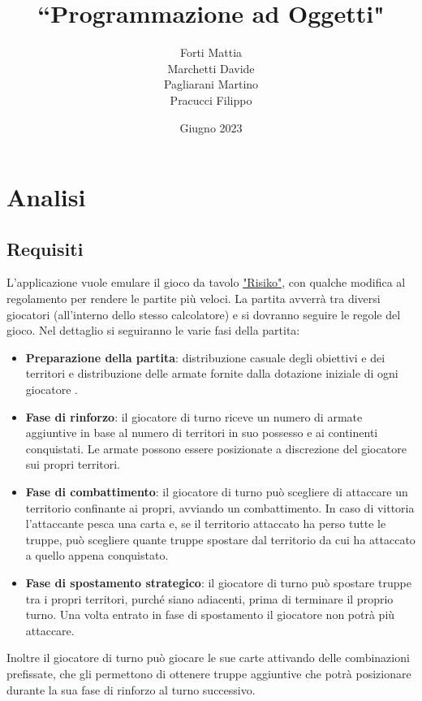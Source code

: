 \documentclass[a4paper,12pt]{report}
\title{\textbf{``Programmazione ad Oggetti"}}
\author{Forti Mattia \\Marchetti Davide  \\Pagliarani Martino \\Pracucci Filippo}
\date{Giugno 2023}
\begin{document}
\maketitle

\newpage

\tableofcontents
\chapter{Analisi}
%
\section{Requisiti}
L'applicazione vuole emulare il gioco da tavolo \href{https://risiko.it/wp-content/uploads/2017/10/Regolamento-Risiko.pdf}{"Risiko"}, con qualche modifica al regolamento per rendere le partite pi\`u veloci.
La partita avverr\`a tra diversi giocatori (all'interno dello stesso calcolatore) e si dovranno seguire le regole del gioco.
Nel dettaglio si seguiranno le varie fasi della partita:
\begin{itemize}
    \item \textbf{Preparazione della partita}: distribuzione casuale degli obiettivi e dei territori e distribuzione delle armate fornite dalla dotazione iniziale di ogni giocatore .
    \item \textbf{Fase di rinforzo}: il giocatore di turno riceve un numero di armate aggiuntive in base al numero di territori in suo possesso e ai continenti conquistati. Le armate possono essere posizionate a discrezione del giocatore sui propri territori.
    \item \textbf{Fase di combattimento}: il giocatore di turno pu\`o scegliere di attaccare un territorio confinante ai propri, avviando un combattimento. In caso di vittoria l'attaccante pesca una carta e, se il territorio attaccato ha perso tutte le truppe, pu\`o scegliere quante truppe spostare dal territorio da cui ha attaccato a quello appena conquistato.
    \item \textbf{Fase di spostamento strategico}: il giocatore di turno pu\`o spostare truppe tra i propri territori, purch\'e siano adiacenti, prima di terminare il proprio turno. Una volta entrato in fase di spostamento il giocatore non potr\`a pi\`u attaccare.
\end{itemize}
Inoltre il giocatore di turno pu\`o giocare le sue carte attivando delle combinazioni prefissate, che gli permettono di ottenere truppe aggiuntive che potr\`a posizionare durante la sua fase di rinforzo al turno successivo.
%
\end{document}
